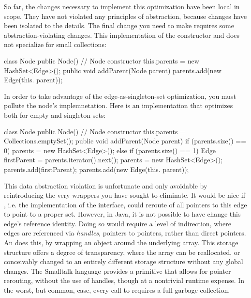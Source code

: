 So far, the changes necessary to implement this optimization have been local in
scope. They have not violated any principles of abstraction, because changes have
been isolated to the  details. The final change you need to make
requires some abstraction-violating changes. This implementation of the
constructor and  does not specialize for small collections:

\begin{shortlisting}
class Node {
  public Node() { // Node constructor
     this.parents = new HashSet<Edge>();
  }
  public void addParent(Node parent) {
     parents.add(new Edge(this. parent));
  }
}
\end{shortlisting} 

In order to take advantage of the edge-as-singleton-set optimization, you must
pollute the node's  implemnetation. Here is an implementation
that optimizes both for empty and singleton sets:

\begin{shortlisting}
class Node {
  public Node() { // Node constructor
     this.parents = Collections.emptySet();
  }
  public void addParent(Node parent) {
     if (parents.size() == 0) parents = new HashSet<Edge>();
     else if (parents.size() == 1) {
        Edge firstParent = parents.iterator().next();
        parents = new HashSet<Edge>();
        parents.add(firstParent);
     }
     parents.add(new Edge(this. parent));
  }
}
\end{shortlisting} 

This data abstraction violation is unfortunate and only avoidable by
reintroducing the very wrappers you have sought to eliminate. It would be nice if
, i.e. the implementation of the  interface, could
reroute of all pointers to this edge to point to a proper set. However, in Java,
it is not possible to have  change this edge's reference
identity. Doing so would require a level of indirection, where edges are
referenced via \emph{handles}, pointers to pointers, rather than direct
pointers. An  does this, by wrapping an object
around the underlying array. This storage structure offers a degree of
transparency, where the array can be reallocated, or conceivably changed to an
entirely different storage structure without any global changes. The Smalltalk
language provides a 
primitive that allows for pointer rerouting,
without the use of handles, though at a nontrivial runtime expense. In the worst,
but common, case, every call to  requires a full garbage collection.

